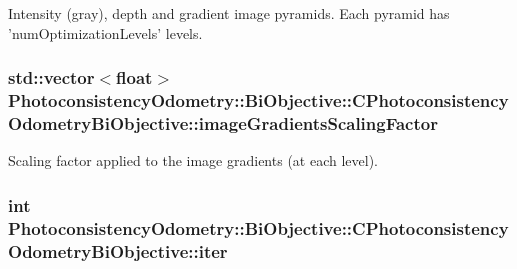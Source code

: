 \label{class_photoconsistency_odometry_1_1_bi_objective_1_1_c_photoconsistency_odometry_bi_objective_a5b6c425d383f581b45ca8865972a37b7}
Intensity (gray), depth and gradient image pyramids. Each pyramid has 'numOptimizationLevels' levels. \hypertarget{class_photoconsistency_odometry_1_1_bi_objective_1_1_c_photoconsistency_odometry_bi_objective_a0a5c463a29e8b400d7f8137f3f55fe79}{
\subsubsection[{imageGradientsScalingFactor}]{\setlength{\rightskip}{0pt plus 5cm}std::vector$<$float$>$ {\bf PhotoconsistencyOdometry::BiObjective::CPhotoconsistencyOdometryBiObjective::imageGradientsScalingFactor}}}
\label{class_photoconsistency_odometry_1_1_bi_objective_1_1_c_photoconsistency_odometry_bi_objective_a0a5c463a29e8b400d7f8137f3f55fe79}
Scaling factor applied to the image gradients (at each level). \hypertarget{class_photoconsistency_odometry_1_1_bi_objective_1_1_c_photoconsistency_odometry_bi_objective_a674c302e691993256dd46f7be45439ef}{
\subsubsection[{iter}]{\setlength{\rightskip}{0pt plus 5cm}int {\bf PhotoconsistencyOdometry::BiObjective::CPhotoconsistencyOdometryBiObjective::iter}}}
\label{class_photoconsistency_odometry_1_1_bi_objective_1_1_c_photoconsistency_odometry_bi_objective_a674c302e691993256dd46f7be45439ef}
